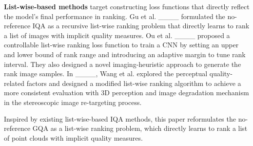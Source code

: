 \textbf{List-wise-based methods} target constructing loss functions that directly reflect the model's final performance in ranking. 
Gu et al. ____ formulated the no-reference IQA as a recursive list-wise ranking problem that directly learns to rank a list of images with implicit quality measures.
Ou et al. ____ proposed a controllable list-wise ranking loss function to train a CNN by setting an upper and lower bound of rank range and introducing an adaptive margin to tune rank interval. 
They also designed a novel imaging-heuristic approach to generate the rank image samples.
In ____, Wang et al. explored the perceptual quality-related factors and designed a modified list-wise ranking algorithm to achieve a more consistent evaluation with 3D perception and image degradation mechanism in the stereoscopic image re-targeting process.

Inspired by existing list-wise-based IQA methods, this paper reformulates the no-reference GQA as a list-wise ranking problem, which directly learns to rank a list of point clouds with implicit quality measures.
